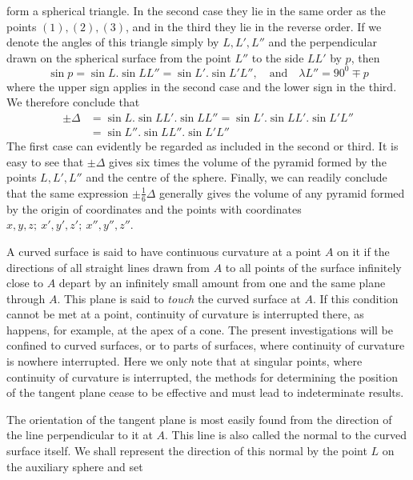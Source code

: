 form a spherical triangle. In the second case they lie in the same order as the points \((1),(2),(3)\), and in the third they lie in the reverse order. If we denote the angles of this triangle simply by \(L,L',L''\) and the perpendicular drawn on the spherical surface from the point \(L''\) to the side \(LL'\) by \(p\), then
\[
\sin p=\sin L\mathord{.}\sin LL''=\sin L'\mathord{.}\sin L'L'',\quad\text{and}\quad\lambda L''=90^0\mp p
\]
\noindent where the upper sign applies in the second case and the lower sign in the third. We therefore conclude that
\[
\begin{aligned}
\pm\Delta&=\sin L\mathord{.}\sin LL'\mathord{.}\sin LL''=\sin L'\mathord{.}\sin LL'\mathord{.}\sin L'L''\\
&=\sin L''\mathord{.}\sin LL''\mathord{.}\sin L'L''
\end{aligned}
\]
\noindent The first case can evidently be regarded as included in the second or third. It is easy to see that \(\pm\Delta\) gives six times the volume of the pyramid formed by the points \(L,L',L''\) and the centre of the sphere. Finally, we can readily conclude that the same expression \(\pm\tfrac{1}{6}\Delta\) generally gives the volume of any pyramid formed by the origin of coordinates and the points with coordinates \(x,y,z;\ x',y',z';\ x'',y'',z''\).

\indent A curved surface is said to have continuous curvature at a point \(A\) on it if the directions of all straight lines drawn from \(A\) to all points of the surface infinitely close to \(A\) depart by an infinitely small amount from one and the same plane through \(A\). This plane is said to \textit{touch} the curved surface at \(A\). If this condition cannot be met at a point, continuity of curvature is interrupted there, as happens, for example, at the apex of a cone. The present investigations will be confined to curved surfaces, or to parts of surfaces, where continuity of curvature is nowhere interrupted. Here we only note that at singular points, where continuity of curvature is interrupted, the methods for determining the position of the tangent plane cease to be effective and must lead to indeterminate results.

\indent The orientation of the tangent plane is most easily found from the direction of the line perpendicular to it at \(A\). This line is also called the normal to the curved surface itself. We shall represent the direction of this normal by the point \(L\) on the auxiliary sphere and set
